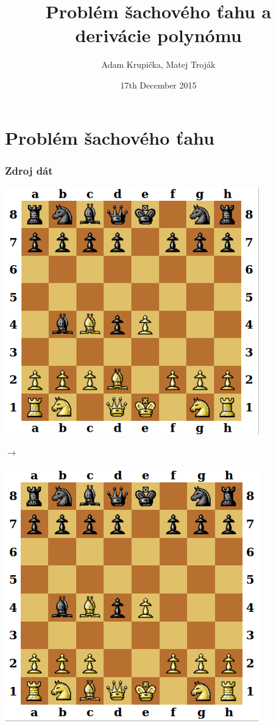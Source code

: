 \documentclass[red]{beamer}
\title{Problém šachového ťahu a derivácie polynómu}
\author{Adam Krupička, Matej Troják}
\institute{FI MUNI}
\date{17th December 2015}
\begin{document}
\begin{frame}
  \titlepage
\end{frame}

\section{Problém šachového ťahu}

\begin{frame}
\frametitle{Zdroj dát} 
\begin{center}
\begin{minipage}{0.4\textwidth}
\begin{center}
\includegraphics[scale=0.25]{from}
\end{center}
\end{minipage}%
\begin{minipage}{0.1\textwidth}
\begin{center}
$\longrightarrow$
\end{center}
\end{minipage}
\begin{minipage}{0.4\textwidth}
\begin{center}
\includegraphics[scale=0.25]{to}

\end{center}
\end{minipage}
\end{center}
\end{frame}
\end{document}
